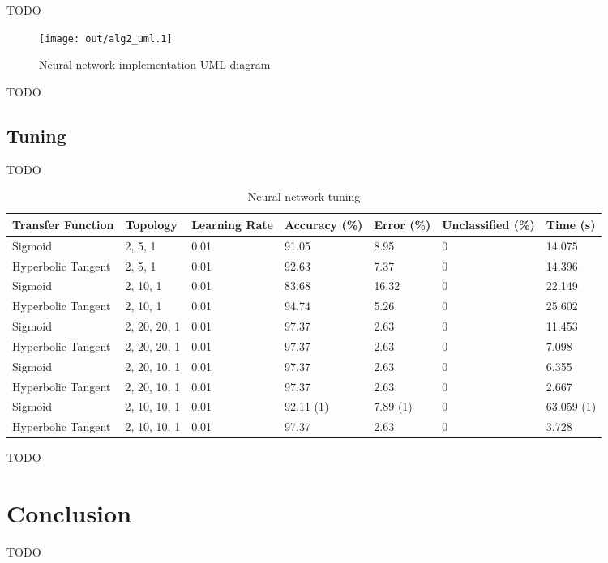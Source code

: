 \documentclass[a4paper]{article}
\begin{document}
TODO

\begin{figure}[h!]
  \centering
  \texttt{[image: out/alg2\_uml.1]}
  \caption{Neural network implementation UML diagram}
  \label{fig:alg2_uml}
\end{figure}

TODO

\subsection{Tuning}

TODO

\begin{table}[h!]
  \centering
  \begin{tabular}{@{}lllllll@{}}
    \toprule
    Transfer Function  & Topology     & Learning Rate & Accuracy (\%) & Error (\%) & Unclassified (\%) & Time (s)   \\
    \midrule
    Sigmoid            & 2, 5, 1      & 0.01          & 91.05         & 8.95       & 0                 & 14.075     \\
    Hyperbolic Tangent & 2, 5, 1      & 0.01          & 92.63         & 7.37       & 0                 & 14.396     \\
    Sigmoid            & 2, 10, 1     & 0.01          & 83.68         & 16.32      & 0                 & 22.149     \\
    Hyperbolic Tangent & 2, 10, 1     & 0.01          & 94.74         & 5.26       & 0                 & 25.602     \\
    Sigmoid            & 2, 20, 20, 1 & 0.01          & 97.37         & 2.63       & 0                 & 11.453     \\
    Hyperbolic Tangent & 2, 20, 20, 1 & 0.01          & 97.37         & 2.63       & 0                 & 7.098      \\
    Sigmoid            & 2, 20, 10, 1 & 0.01          & 97.37         & 2.63       & 0                 & 6.355      \\
    Hyperbolic Tangent & 2, 20, 10, 1 & 0.01          & 97.37         & 2.63       & 0                 & 2.667      \\
    Sigmoid            & 2, 10, 10, 1 & 0.01          & 92.11 (1)     & 7.89 (1)   & 0                 & 63.059 (1) \\
    Hyperbolic Tangent & 2, 10, 10, 1 & 0.01          & 97.37         & 2.63       & 0                 & 3.728      \\
    \bottomrule
  \end{tabular}
  \caption{Neural network tuning}
  \label{tab:nn_tuning}
\end{table}

TODO

\section{Conclusion}

TODO

\end{document}
